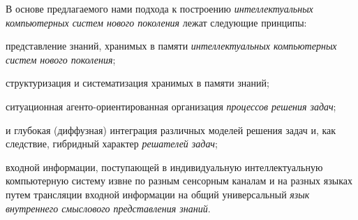 В основе предлагаемого нами подхода к построению \textit{интеллектуальных компьютерных систем нового поколения} лежат следующие принципы:
\begin{textitemize}
	\item {} представление знаний, хранимых в памяти \textit{интеллектуальных компьютерных систем нового поколения};
	\item {} структуризация и систематизация хранимых в памяти знаний;
	\item {} ситуационная агенто-ориентированная организация \textit{процессов решения задач};
	\item {} и глубокая (диффузная) интеграция различных моделей решения задач и, как следствие, гибридный характер \textit{решателей задач};
	\item {} входной информации, поступающей в индивидуальную интеллектуальную компьютерную систему извне по разным сенсорным каналам и на разных языках путем трансляции входной информации на общий универсальный \textit{язык внутреннего смыслового представления знаний}.
\end{textitemize}

\begin{SCn}
\begin{scnhaselementset}
	\begin{scnindent}
		\begin{scnsubdividing}
			\begin{scnindent}
			\end{scnindent}
		\end{scnsubdividing}
	\end{scnindent} 
\end{scnhaselementset}
\end{SCn}

